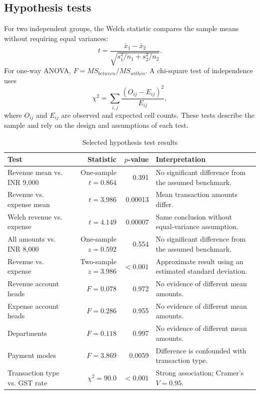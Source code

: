 \documentclass[11pt,a4paper]{article}
\begin{document}
\subsection{Hypothesis tests}
For two independent groups, the Welch statistic compares the sample means without requiring equal variances:
\begin{equation}
  t = \frac{\bar{x}_1-\bar{x}_2}
  {\sqrt{s_1^2/n_1+s_2^2/n_2}}.
\end{equation}
For one-way ANOVA, $F=MS_{between}/MS_{within}$. A chi-square test of independence uses
\begin{equation}
  \chi^2 = \sum_{i,j}\frac{(O_{ij}-E_{ij})^2}{E_{ij}},
\end{equation}
where $O_{ij}$ and $E_{ij}$ are observed and expected cell counts. These tests describe the sample and rely on the design and assumptions of each test.

\begin{table}[H]
\centering
\caption{Selected hypothesis test results}
\small
\begin{tabularx}{\textwidth}{>{\raggedright\arraybackslash}Xrr>{\raggedright\arraybackslash}p{}}
\toprule
Test & Statistic & $p$-value & Interpretation\\
\midrule
Revenue mean vs. INR 9,000 & One-sample $t=0.864$ & 0.391 & No significant difference from the assumed benchmark.\\
Revenue vs. expense mean & $t=3.986$ & 0.00013 & Mean transaction amounts differ.\\
Welch revenue vs. expense & $t=4.149$ & 0.00007 & Same conclusion without equal-variance assumption.\\
All amounts vs. INR 8,000 & One-sample $z=0.592$ & 0.554 & No significant difference from the assumed benchmark.\\
Revenue vs. expense & Two-sample $z=3.986$ & $<0.001$ & Approximate result using an estimated standard deviation.\\
Revenue account heads & $F=0.078$ & 0.972 & No evidence of different mean amounts.\\
Expense account heads & $F=0.286$ & 0.955 & No evidence of different mean amounts.\\
Departments & $F=0.118$ & 0.997 & No evidence of different mean amounts.\\
Payment modes & $F=3.869$ & 0.0059 & Difference is confounded with transaction type.\\
Transaction type vs. GST rate & $\chi^2=90.0$ & $<0.001$ & Strong association; Cramer's $V=0.95$.\\
\bottomrule
\end{tabularx}
\end{table}
\end{document}
